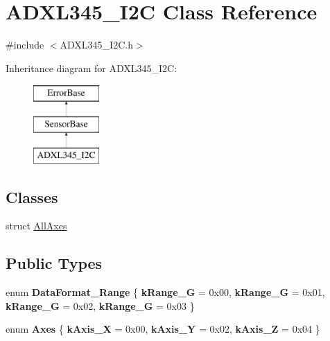 \hypertarget{classADXL345__I2C}{\section{\-A\-D\-X\-L345\-\_\-\-I2\-C \-Class \-Reference}
\label{classADXL345__I2C}
}


{\ttfamily \#include $<$\-A\-D\-X\-L345\-\_\-\-I2\-C.\-h$>$}

\-Inheritance diagram for \-A\-D\-X\-L345\-\_\-\-I2\-C\-:\begin{figure}[H]
\begin{center}
\leavevmode
\includegraphics[height=3.000000cm]{classADXL345__I2C}
\end{center}
\end{figure}
\subsection*{\-Classes}
\begin{DoxyCompactItemize}
\item 
struct \hyperlink{structADXL345__I2C_1_1AllAxes}{\-All\-Axes}
\end{DoxyCompactItemize}
\subsection*{\-Public \-Types}
\begin{DoxyCompactItemize}
\item 
enum {\bfseries \-Data\-Format\-\_\-\-Range} \{ {\bfseries k\-Range\-\_\-G} = 0x00, 
{\bfseries k\-Range\-\_\-G} = 0x01, 
{\bfseries k\-Range\-\_\-G} = 0x02, 
{\bfseries k\-Range\-\_\-G} = 0x03
 \}
\item 
enum {\bfseries \-Axes} \{ {\bfseries k\-Axis\-\_\-\-X} = 0x00, 
{\bfseries k\-Axis\-\_\-\-Y} = 0x02, 
{\bfseries k\-Axis\-\_\-\-Z} = 0x04
 \}
\end{DoxyCompactItemize}
